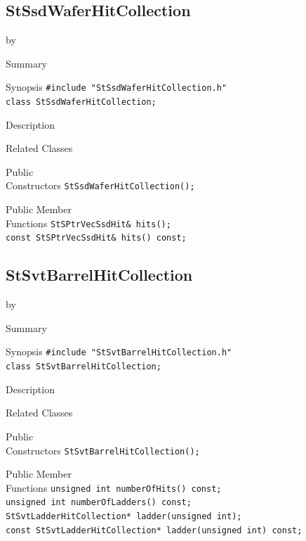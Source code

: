 \documentclass[twoside]{article}
\newcommand{\entrylabel}[1]{\mbox{\textbf{{#1}}}\hfil}%
\newenvironment{entry}
{\begin{list}{}%
    {\renewcommand{\makelabel}{\entrylabel}%
     \setlength{\labelwidth}{90pt}%
     \setlength{\leftmargin}{\labelwidth}
     \advance\leftmargin by \labelsep%
      }%
    }%
  {\end{list}}
\newcommand{\Entrylabel}[1]%
{\raisebox{0pt}[1ex][0pt]{\makebox[\labelwidth][l]%
    {\parbox[t]{\labelwidth}{\hspace{0pt}\textbf{{#1}}}}}}
\newenvironment{Entry}%
{\renewcommand{\entrylabel}{\Entrylabel}\begin{entry}}%
  {\end{entry}}
\begin{document}
\subsection{StSsdWaferHitCollection}
\label{sec:StSsdWaferHitCollection}
\begin{Entry}
\item[Summary]
\item[Synopsis]
    \verb+#include "StSsdWaferHitCollection.h"+\\
    \verb+class StSsdWaferHitCollection;+\\
\item[Description]
\item[Related Classes]
\item[Public\\ Constructors]
    \verb+StSsdWaferHitCollection();+\\
\item[Public Member\\ Functions]
    \verb+StSPtrVecSsdHit& hits();+\\
    \verb+const StSPtrVecSsdHit& hits() const;+\\
\end{Entry}
\clearpage

\subsection{StSvtBarrelHitCollection}
\label{sec:StSvtBarrelHitCollection}
\begin{Entry}
\item[Summary]
\item[Synopsis]
    \verb+#include "StSvtBarrelHitCollection.h"+\\
    \verb+class StSvtBarrelHitCollection;+\\
\item[Description]
\item[Related Classes]
\item[Public\\ Constructors]
    \verb+StSvtBarrelHitCollection();+\\
\item[Public Member\\ Functions]
    \verb+unsigned int numberOfHits() const;+\\
    \verb+unsigned int numberOfLadders() const;+\\
    \verb+StSvtLadderHitCollection* ladder(unsigned int);+\\
    \verb+const StSvtLadderHitCollection* ladder(unsigned int) const;+\\
\end{Entry}
\clearpage
\end{document}
